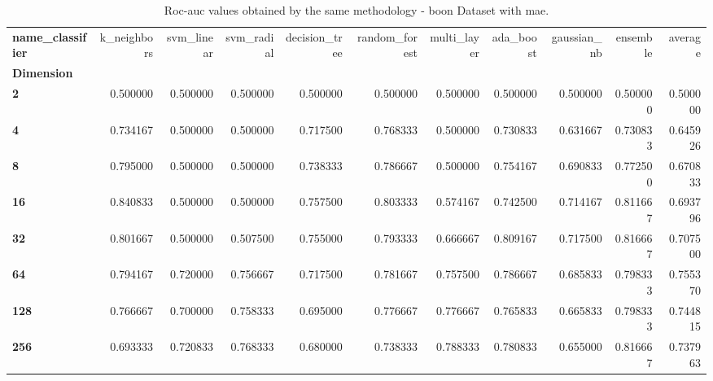\begin{table}
\centering
\caption{Roc-auc values obtained by the same methodology - boon Dataset with mae.}
\label{roc-auc_boon_mae-reproduction}
\begin{tabular}{lrrrrrrrrrr}
\toprule
\textbf{name\_classifier} &  k\_neighbors &  svm\_linear &  svm\_radial &  decision\_tree &  random\_forest &  multi\_layer &  ada\_boost &  gaussian\_nb &  ensemble &   average \\
\textbf{Dimension} &              &             &             &                &                &              &            &              &           &           \\
\midrule
\textbf{2        } &     0.500000 &    0.500000 &    0.500000 &       0.500000 &       0.500000 &     0.500000 &   0.500000 &     0.500000 &  0.500000 &  0.500000 \\
\textbf{4        } &     0.734167 &    0.500000 &    0.500000 &       0.717500 &       0.768333 &     0.500000 &   0.730833 &     0.631667 &  0.730833 &  0.645926 \\
\textbf{8        } &     0.795000 &    0.500000 &    0.500000 &       0.738333 &       0.786667 &     0.500000 &   0.754167 &     0.690833 &  0.772500 &  0.670833 \\
\textbf{16       } &     0.840833 &    0.500000 &    0.500000 &       0.757500 &       0.803333 &     0.574167 &   0.742500 &     0.714167 &  0.811667 &  0.693796 \\
\textbf{32       } &     0.801667 &    0.500000 &    0.507500 &       0.755000 &       0.793333 &     0.666667 &   0.809167 &     0.717500 &  0.816667 &  0.707500 \\
\textbf{64       } &     0.794167 &    0.720000 &    0.756667 &       0.717500 &       0.781667 &     0.757500 &   0.786667 &     0.685833 &  0.798333 &  0.755370 \\
\textbf{128      } &     0.766667 &    0.700000 &    0.758333 &       0.695000 &       0.776667 &     0.776667 &   0.765833 &     0.665833 &  0.798333 &  0.744815 \\
\textbf{256      } &     0.693333 &    0.720833 &    0.768333 &       0.680000 &       0.738333 &     0.788333 &   0.780833 &     0.655000 &  0.816667 &  0.737963 \\
\bottomrule
\end{tabular}
\end{table}
